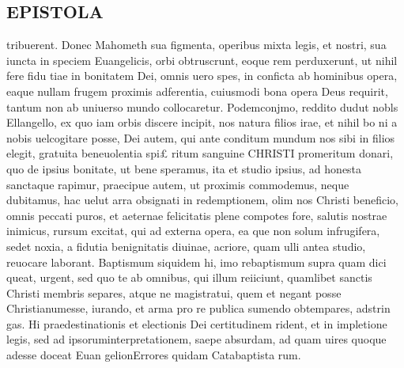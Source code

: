 \documentclass{article}
\begin{document}
\begin{pages}
\section*{EPISTOLA}\pstart tribuerent. Donec Mahometh sua figmenta, operibus mixta legis, et nostri, sua iuncta in speciem Euangelicis, orbi obtruscrunt, eoque rem perduxerunt, ut nihil fere fidu tiae in bonitatem Dei, omnis uero spes, in conficta ab hominibus opera, eaque nullam frugem proximis adferentia, cuiusmodi bona opera Deus requirit, tantum non ab uniuerso mundo collocaretur.  \pend\pstart  Podemconjmo, reddito dudut nobls Ellangello, ex quo iam orbis discere incipit, nos natura filios irae, et nihil bo ni a nobis uelcogitare posse, Dei autem, qui ante conditum mundum nos sibi in filios elegit, gratuita beneuolentia spi£ ritum sanguine CHRISTI promeritum donari, quo de ipsius bonitate, ut bene speramus, ita et studio ipsius, ad honesta sanctaque rapimur, praecipue autem, ut proximis commodemus, neque dubitamus, hac uelut arra obsignati in redemptionem, olim nos Christi beneficio, omnis peccati puros, et aeternae felicitatis plene compotes fore, salutis nostrae inimicus, rursum excitat, qui ad externa opera, ea que non solum infrugifera, sedet noxia, a fidutia benignitatis diuinae, acriore, quam ulli antea studio, reuocare laborant. Baptismum siquidem hi, imo rebaptismum supra quam dici queat, urgent, sed quo te ab omnibus, qui illum reiiciunt, quamlibet sanctis Christi membris separes, atque ne magistratui, quem et negant posse Christianumesse, iurando, et arma pro re publica sumendo obtempares, adstrin gas. Hi praedestinationis et electionis Dei certitudinem rident, et in impletione legis, sed ad ipsoruminterpretationem, saepe absurdam, ad quam uires quoque adesse  \pendQuiu doceat Euan gelionErrores quidam Catabaptista rum. 

\end{pages}
\end{document}
